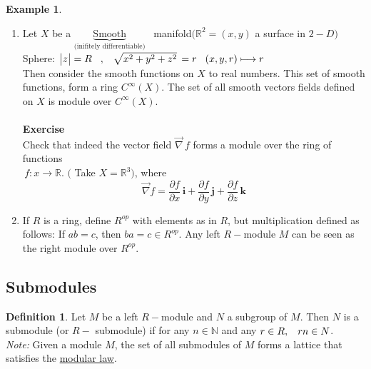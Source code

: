 \documentclass[11pt,a4paper]{article}
\theoremstyle{definition}
\newtheorem{defn}[thm]{Definition}
\newtheorem{exa}[thm]{Example}
\begin{document}
\begin{exa}
\begin{enumerate}
\item Let $X$ be a  $\underbrace{\text{Smooth}}_{\text{(inifitely differentiable)}}$ $\,$ manifold$(\mathbb{R}^2 = (x,y) $ a surface in $2-D)$\\

Sphere: \hspace{0.3cm} $\begin{vmatrix}
z\\
\end{vmatrix} = R\hspace{0.3cm}, \hspace{0.3cm} \sqrt{x^2 + y^2 + z^2} \, = r\hspace{0.3cm} (x, y , r)\longmapsto r$\\
Then consider the smooth functions on $X$ to real numbers. This set of smooth functions, form a ring $C^{\infty} (X)$.  The set of all smooth vectors fields defined on $X$ is module over $C^{\infty}(X)$.\\\\



\textbf{Exercise}\\
Check that indeed the vector field $\overrightarrow{\nabla}\, f$ forms a module over the ring of functions\\ $\, f: x \longrightarrow \mathbb{R}$. $($ Take $X=\mathbb{R}^3)$, where
$$\overrightarrow{\nabla} f = \frac{\partial f}{\partial x} \, \textbf{i} + \frac{\partial f}{\partial y}\, \textbf{j} + \frac{\partial f}{\partial z}\, \textbf{k}$$


\item If $R$ is a ring, define $R^{op}$ with elements as in $R$, but multiplication defined as follows: If $ab = c$, then $ba = c \in  R^{op}$. Any left $R-$module $M$ can be seen as the right module over $R^{op}$.
\end{enumerate}
\end{exa}










\subsection{Submodules}

\begin{defn}
Let $M$ be a left $R-$module and $N$ a subgroup of $M$. Then $N$ is a submodule (or $R-$ submodule) if for any $n\in \mathbb{N}$ and any $r\in R,\hspace{0.3cm} rn\in N$.\\

\textit{Note:} Given a module $M$, the set of all submodules of $M$ forms a lattice that satisfies the \underline{modular law}.\\\\
\end{defn}
\end{document}
